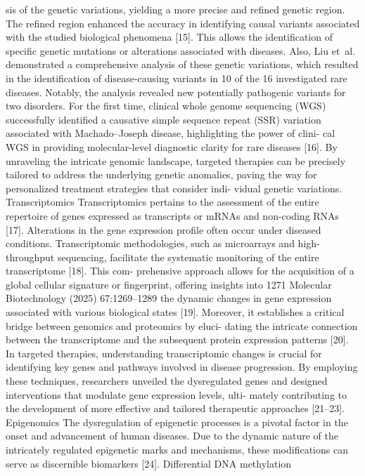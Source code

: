 sis of the genetic variations, yielding a more precise and
refined genetic region. The refined region enhanced the
accuracy in identifying causal variants associated with
the studied biological phenomena [15]. This allows the
identification of specific genetic mutations or alterations
associated with diseases. Also, Liu et al. demonstrated a
comprehensive analysis of these genetic variations, which
resulted in the identification of disease-causing variants
in 10 of the 16 investigated rare diseases. Notably, the
analysis revealed new potentially pathogenic variants for
two disorders. For the first time, clinical whole genome
sequencing (WGS) successfully identified a causative
simple sequence repeat (SSR) variation associated with
Machado–Joseph disease, highlighting the power of clini-
cal WGS in providing molecular-level diagnostic clarity
for rare diseases [16]. By unraveling the intricate genomic
landscape, targeted therapies can be precisely tailored to
address the underlying genetic anomalies, paving the way
for personalized treatment strategies that consider indi-
vidual genetic variations.
Transcriptomics
Transcriptomics pertains to the assessment of the entire
repertoire of genes expressed as transcripts or mRNAs
and non-coding RNAs [17]. Alterations in the gene
expression profile often occur under diseased conditions.
Transcriptomic methodologies, such as microarrays and
high-throughput sequencing, facilitate the systematic
monitoring of the entire transcriptome [18]. This com-
prehensive approach allows for the acquisition of a global
cellular signature or fingerprint, offering insights into
1271
Molecular Biotechnology (2025) 67:1269–1289
the dynamic changes in gene expression associated with
various biological states [19]. Moreover, it establishes a
critical bridge between genomics and proteomics by eluci-
dating the intricate connection between the transcriptome
and the subsequent protein expression patterns [20]. In
targeted therapies, understanding transcriptomic changes
is crucial for identifying key genes and pathways involved
in disease progression. By employing these techniques,
researchers unveiled the dysregulated genes and designed
interventions that modulate gene expression levels, ulti-
mately contributing to the development of more effective
and tailored therapeutic approaches [21–23].
Epigenomics
The dysregulation of epigenetic processes is a pivotal factor
in the onset and advancement of human diseases. Due to
the dynamic nature of the intricately regulated epigenetic
marks and mechanisms, these modifications can serve as
discernible biomarkers [24]. Differential DNA methylation
